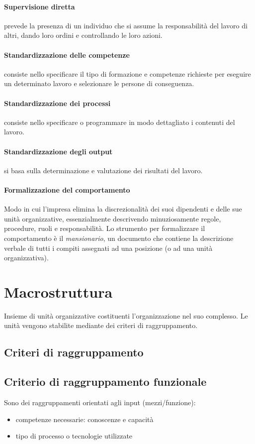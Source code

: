 \paragraph{Supervisione diretta}
prevede la presenza di un individuo che si assume la responsabilità del
lavoro di altri, dando loro ordini e controllando le loro azioni.
\paragraph{Standardizzazione delle competenze}
consiste nello specificare il tipo di formazione e competenze richieste per
eseguire un determinato lavoro e selezionare le persone di
conseguenza.
\paragraph{Standardizzazione dei processi}
consiste nello specificare o programmare in modo dettagliato i contenuti
del lavoro.
\paragraph{Standardizzazione degli output} si basa sulla determinazione e valutazione dei risultati del lavoro.

\paragraph{Formalizzazione del comportamento}
Modo in cui l'impresa elimina la discrezionalità dei suoi dipendenti e
delle sue unità organizzative, essenzialmente descrivendo
minuziosamente regole, procedure, ruoli e responsabilità.
Lo strumento per formalizzare il comportamento è il \emph{mansionario}, un documento che contiene la descrizione verbale di tutti i compiti
assegnati ad una posizione (o ad una unità organizzativa).

\section{Macrostruttura}
Insieme di unità organizzative costituenti l'organizzazione
nel suo complesso. Le unità vengono stabilite mediante dei criteri di raggruppamento.

\subsection{Criteri di raggruppamento}
\subsection{Criterio di raggruppamento funzionale}
Sono dei raggruppamenti orientati agli input
(mezzi/funzione):
\begin{itemize}
	\item competenze necessarie: conoscenze e capacità
	\item tipo di processo o tecnologie utilizzate
\end{itemize}

